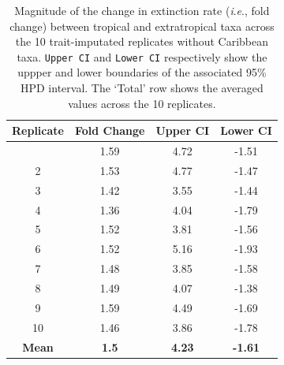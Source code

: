 \documentclass[
  9pt,
  letterpaper,
]{article}
\begin{document}
\begin{longtable}[]{@{}cccc@{}}

\caption{\label{tbl-FC_ET}Magnitude of the change in extinction rate
(\emph{i}.\emph{e}., fold change) between tropical and extratropical
taxa across the 10 trait-imputated replicates without Caribbean taxa.
\texttt{Upper\ CI} and \texttt{Lower\ CI} respectively show the uppper
and lower boundaries of the associated 95\% HPD interval. The `Total'
row shows the averaged values across the 10 replicates.}

\tabularnewline

\toprule\noalign{}
Replicate & Fold Change & Upper CI & Lower CI \\
\midrule\noalign{}
\endhead
\bottomrule\noalign{}
\endlastfoot
1 & 1.59 & 4.72 & -1.51 \\
2 & 1.53 & 4.77 & -1.47 \\
3 & 1.42 & 3.55 & -1.44 \\
4 & 1.36 & 4.04 & -1.79 \\
5 & 1.52 & 3.81 & -1.56 \\
6 & 1.52 & 5.16 & -1.93 \\
7 & 1.48 & 3.85 & -1.58 \\
8 & 1.49 & 4.07 & -1.38 \\
9 & 1.59 & 4.49 & -1.69 \\
10 & 1.46 & 3.86 & -1.78 \\
\textbf{Mean} & \textbf{1.5} & \textbf{4.23} & \textbf{-1.61} \\

\end{longtable}
\end{document}
